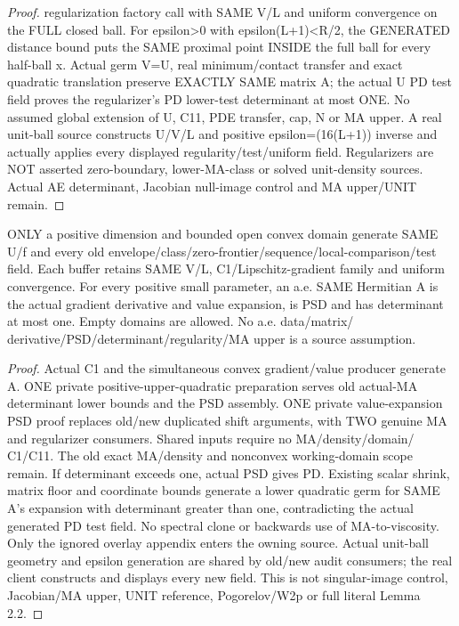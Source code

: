 \begin{proof}
  regularization factory call with SAME V/L and uniform convergence on the
  FULL closed ball. For epsilon>0 with epsilon(L+1)<R/2, the GENERATED distance
  bound puts the SAME proximal point INSIDE the full ball for every half-ball
  x. Actual germ V=U, real minimum/contact transfer and exact quadratic
  translation preserve EXACTLY SAME matrix A; the actual U PD test field
  proves the regularizer's PD lower-test determinant at most ONE. No assumed
  global extension of U, C11, PDE transfer, cap, N or MA upper. A real unit-ball
  source constructs U/V/L and positive epsilon=(16(L+1)) inverse and actually
  applies every displayed regularity/test/uniform field. Regularizers are
  NOT asserted zero-boundary, lower-MA-class or solved unit-density sources.
  Actual AE determinant, Jacobian null-image control and MA upper/UNIT remain.
\end{proof}

\begin{lemma}
  \label{lem:regularized-ae-det}
  \leanok
  ONLY a positive dimension and bounded open convex domain generate SAME U/f
  and every old envelope/class/zero-frontier/sequence/local-comparison/test
  field. Each buffer retains SAME V/L, C1/Lipschitz-gradient family and uniform
  convergence. For every positive small parameter, an a.e. SAME Hermitian A
  is the actual gradient derivative and value expansion, is PSD and has
  determinant at most one. Empty domains are allowed. No a.e. data/matrix/
  derivative/PSD/determinant/regularity/MA upper is a source assumption.
\end{lemma}
\begin{proof}
  \leanok
  Actual C1 and the simultaneous convex gradient/value producer generate A.
  ONE private positive-upper-quadratic preparation serves old actual-MA
  determinant lower bounds and the PSD assembly. ONE private value-expansion
  PSD proof replaces old/new duplicated shift arguments, with TWO genuine
  MA and regularizer consumers. Shared inputs require no MA/density/domain/
  C1/C11. The old exact MA/density and nonconvex working-domain scope remain.
  If determinant exceeds one, actual PSD gives PD. Existing scalar shrink,
  matrix floor and coordinate bounds generate a lower quadratic germ for
  SAME A's expansion with determinant greater than one, contradicting the
  actual generated PD test field. No spectral clone or backwards use of
  MA-to-viscosity. Only the ignored overlay appendix enters the owning source.
  Actual unit-ball geometry and epsilon generation are shared by old/new
  audit consumers; the real client constructs and displays every new field.
  This is not singular-image control, Jacobian/MA upper, UNIT reference,
  Pogorelov/W2p or full literal Lemma 2.2.
\end{proof}

